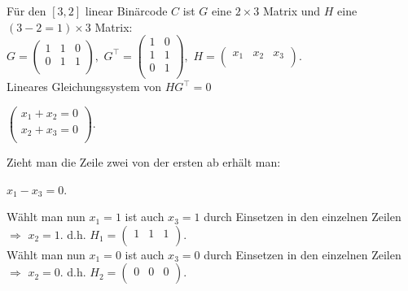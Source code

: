 \begin{Beispiel}
    F{\"u}r den $[3,2]$ linear Binärcode \(C\) ist $G$  eine $2 \times 3$ Matrix und $H$ eine $(3-2=1) \times 3$ Matrix:\\
    
    $G=\left( \begin{array}{rrr}
        1 & 1 & 0 \\
        0 & 1 & 1 \\
     \end{array}\right),
    $
    $G^\intercal=\left( \begin{array}{rrr}
    1 & 0 \\
    1 & 1 \\
    0 & 1 \\
    \end{array}\right), 
    $
    $H=\left( \begin{array}{rrr}
    x_1 & x_2 & x_3 \\
    \end{array}\right).
    $
    \\
    
    Lineares Gleichungssystem von $HG^\intercal = 0$ 
    
    $\left( \begin{array}{rrr}
    x_1+x_2 = 0 \\
    x_2+x_3 = 0 \\
    \end{array}\right).
    $
    
    Zieht man die Zeile zwei von der ersten ab erhält man:
    
    
    $x_1-x_3 = 0$.
    
    Wählt man nun $x_1 = 1$ ist auch $x_3 = 1$ durch Einsetzen in den einzelnen Zeilen $\Rightarrow$ $x_2 = 1$.
    d.h. 
    $H_1=\left( \begin{array}{rrr}
              1 & 1 & 1 \\
             \end{array}\right).
    $
    \\
    
    Wählt man nun $x_1 = 0$ ist auch $x_3 = 0$ durch Einsetzen in den einzelnen Zeilen $\Rightarrow$ $x_2 = 0$.
    d.h. 
    $H_2=\left( \begin{array}{rrr}
              0 & 0 & 0 \\
             \end{array}\right).
    $
    \\
    

\end{Beispiel}
